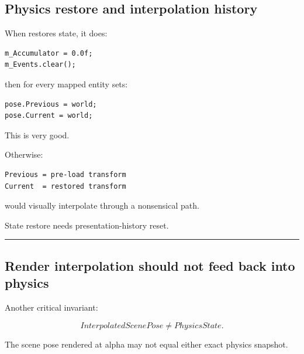 \subsection{Physics restore and interpolation history}\label{06-engine-ii-ch038-physics-restore-and-interpolation-history}

\hypertarget{06-engine-ii-ch038-physics-restore-and-interpolation-history}{}

When  restores state, it does:

\begin{verbatim}
m_Accumulator = 0.0f;
m_Events.clear();
\end{verbatim}

then for every mapped entity sets:

\begin{verbatim}
pose.Previous = world;
pose.Current = world;
\end{verbatim}

This is very good.

Otherwise:

\begin{verbatim}
Previous = pre-load transform
Current  = restored transform
\end{verbatim}

would visually interpolate through a nonsensical path.

State restore needs presentation-history reset.

\begin{center}\rule{0.5\linewidth}{0.5pt}\end{center}

\subsection{Render interpolation should not feed back into physics}\label{06-engine-ii-ch038-render-interpolation-should-not-feed-back-into-physics}

\hypertarget{06-engine-ii-ch038-render-interpolation-should-not-feed-back-into-physics}{}

Another critical invariant:

\[
\boxed{
InterpolatedScenePose
\neq
PhysicsState.
}
\]

The scene pose rendered at alpha may not equal either exact physics snapshot.

